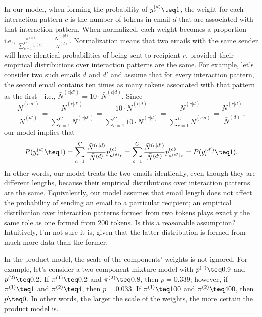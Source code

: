 \documentclass[10pt,english,oneside]{article}
\begin{document}
In our model, when forming the probability of $y_r^{(d)} \teq 1$, the
weight for each interaction pattern $c$ is the number of tokens in
email $d$ that are associated with that interaction pattern. When
normalized, each weight becomes a proportion---i.e.,
$\frac{\pi^{(c)}}{\sum_{c=1}^C \pi^{(c)}} =
\frac{\bar{N}^{(c|d)}}{\bar{N}^{(d)}}$. Normalization means that two
emails with the same sender will have identical probabilities of being
sent to recipient $r$, provided their empirical distributions over
interaction patterns are the same. For example, let's consider two
such emails $d$ and $d'$ and assume that for every interaction
pattern, the second email contains ten times as many tokens associated
with that pattern as the first---i.e., $\bar{N}^{(c|d')} = 10 \cdot
\bar{N}^{(c|d)}$. Since
\begin{equation}
  \frac{\bar{N}^{(c|d')}}{\bar{N}^{(d')}} = \frac{\bar{N}^{(c|d')}}{\sum_{c=1}^C
    \bar{N}^{(c|d')}} = \frac{10 \cdot \bar{N}^{(c|d)}}{\sum_{c=1}^C 10 \cdot
    \bar{N}^{(c|d)}} = \frac{\bar{N}^{(c|d)}}{\sum_{c=1}^C \bar{N}^{(c|d)}} =
  \frac{\bar{N}^{(c|d)}}{\bar{N}^{(d)}},
\end{equation}
our model implies that
\begin{equation}
 P(y^{(d)}_r \teq 1) =
 \sum_{c=1}^C \frac{\bar{N}^{(c|d)}}{\bar{N}^{(d)}}
 p^{(c)}_{a^{(d)}r} =  \sum_{c=1}^C \frac{\bar{N}^{(c|d')}}{\bar{N}^{(d')}}
 p^{(c)}_{a^{(d')}r} = P(y^{(d')}_r \teq 1).
\end{equation}
In other words, our model treats the two emails identically, even
though they are different lengths, because their empirical
distributions over interaction patterns are the same. Equivalently,
our model assumes that email length does not affect the probability of
sending an email to a particular recipient; an empirical distribution
over interaction patterns formed from two tokens plays exactly the
same role as one formed from 200 tokens. Is this a reasonable
assumption? Intuitively, I'm not sure it is, given that the latter
distribution is formed from much more data than the former.

In the product model, the scale of the components' weights is not
ignored. For example, let's consider a two-component mixture model
with $p^{(1)} \teq 0.9$ and $p^{(2)} \teq 0.2$. If $\pi^{(1)} \teq
0.2$ and $\pi^{(2)} \teq 0.8$, then $p = 0.339$; however, if
$\pi^{(1)} \teq 1$ and $\pi^{(2)} \teq 4$, then $p = 0.033$. If
$\pi^{(1)} \teq 100$ and $\pi^{(2)} \teq 400$, then $p \teq 0$. In
other words, the larger the scale of the weights, the more certain the
product model is.
\end{document}
